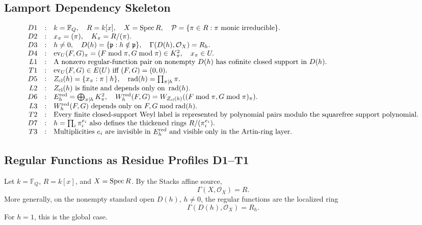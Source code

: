 \subsection{Lamport Dependency Skeleton}
\[
\begin{array}{rcl}
D1&:&k=\mathbb F_Q,\quad R=k[x],\quad X=\operatorname{Spec} R,\quad
      \mathcal P=\{\pi\in R:\pi\text{ monic irreducible}\}.\\
D2&:&x_\pi=(\pi),\quad K_\pi=R/(\pi).\\
D3&:&h\ne0,\quad D(h)=\{\mathfrak p:h\notin\mathfrak p\},\quad
      \Gamma(D(h),\mathcal O_X)=R_h.\\
D4&:&\operatorname{ev}_U(F,G)_\pi=(F\bmod\pi,G\bmod\pi)
      \in K_\pi^2,\quad x_\pi\in U.\\
L1&:&\text{A nonzero regular-function pair on nonempty }D(h)
      \text{ has cofinite closed support in }D(h).\\
T1&:&\operatorname{ev}_U(F,G)\in E(U)\text{ iff }(F,G)=(0,0).\\
D5&:&Z_{\rm cl}(h)=\{x_\pi:\pi\mid h\},\quad
      \operatorname{rad}(h)=\prod_{\pi\mid h}\pi.\\
L2&:&Z_{\rm cl}(h)\text{ is finite and depends only on }
      \operatorname{rad}(h).\\
D6&:&E_h^{\rm red}=\bigoplus_{\pi\mid h}K_\pi^2,\quad
      W_h^{\rm red}(F,G)=W_{Z_{\rm cl}(h)}((F\bmod\pi,G\bmod\pi)_\pi).\\
L3&:&W_h^{\rm red}(F,G)\text{ depends only on }F,G\bmod\operatorname{rad}(h).\\
T2&:&\text{Every finite closed-support Weyl label is represented by
      polynomial pairs modulo the squarefree support polynomial.}\\
D7&:&h=\prod_i\pi_i^{e_i}\text{ also defines the thickened rings }
      R/(\pi_i^{e_i}).\\
T3&:&\text{Multiplicities }e_i\text{ are invisible in }E_h^{\rm red}
      \text{ and visible only in the Artin-ring layer.}
\end{array}
\]

\subsection{Regular Functions as Residue Profiles D1--T1}
Let \(k=\mathbb F_Q\), \(R=k[x]\), and \(X=\operatorname{Spec} R\).  By the Stacks affine
source,
\[
  \Gamma(X,\mathcal O_X)=R.
\]
More generally, on the nonempty standard open \(D(h)\), \(h\ne0\), the regular
functions are the localized ring
\[
  \Gamma(D(h),\mathcal O_X)=R_h.
\]
For \(h=1\), this is the global case.

